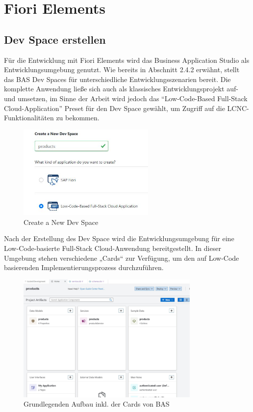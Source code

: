 \section{Fiori Elements}
\subsection{Dev Space erstellen}

Für die Entwicklung mit Fiori Elements wird das Business Application Studio als Entwicklungsumgebung genutzt. Wie bereits in Abschnitt 2.4.2 erwähnt, stellt das BAS Dev Spaces für unterschiedliche Entwicklungsszenarien bereit. Die komplette Anwendung ließe sich auch als klassisches Entwicklungsprojekt auf- und umsetzen, im Sinne der Arbeit wird jedoch das “Low-Code-Based Full-Stack Cloud-Application” Preset für den Dev Space gewählt, um Zugriff auf die LCNC-Funktionalitäten zu bekommen. 

\begin{figure}[htbp]
 \centering
 \includegraphics[width=0.6\textwidth]{Bilder/fiori_element/3_2_create dev space.JPG}
 \caption{Create a New Dev Space}
\end{figure}

Nach der Erstellung des Dev Space wird die Entwicklungsumgebung für eine Low-Code-basierte Full-Stack Cloud-Anwendung bereitgestellt. In dieser Umgebung stehen verschiedene „Cards“ zur Verfügung, um den auf Low-Code basierenden Implementierungsprozess durchzuführen.

\begin{figure}[htbp]
 \centering
 \includegraphics[width=0.8\textwidth]{Bilder/fiori_element/3_3_Cards_von_BAS.JPG}
 \caption{Grundlegenden Aufbau inkl. der Cards von BAS}
\end{figure}

